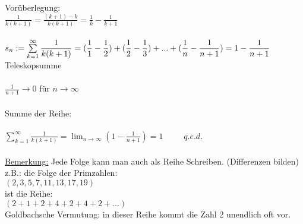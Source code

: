 \vspace{5mm}
Vorüberlegung:\\
$\displaystyle\frac{1}{k(k+1)} = \displaystyle\frac{(k+1) - k}{k(k+1)} = \frac{1}{k} - \displaystyle\frac{1}{k + 1}$\\ \\
$s_n := \sum\limits_{k = 1}^{\infty} \displaystyle\frac{1}{k(k+1)}
= (\displaystyle\frac{1}{1} - \displaystyle\frac{1}{2}) + (\displaystyle\frac{1}{2} - \displaystyle\frac{1}{3}) + ... + (\displaystyle\frac{1}{n} - \displaystyle\frac{1}{n + 1})\\ \\
= 1 - \displaystyle\frac{1}{n + 1}\\ $ Teleskopsumme \\ \\
$\displaystyle\frac{1}{n + 1} \to 0$ für $n \to \infty$\\ \\
Summe der Reihe:\\ \\
$\sum\limits_{k = 1}^{\infty} \displaystyle\frac{1}{k(k+1)} = \lim_{n \to \infty}(1 - \displaystyle\frac{1}{n + 1}) = 1 \phantom{XXX} q.e.d.$\\ 
\\
\underline{Bemerkung:} Jede Folge kann man auch als Reihe Schreiben. (Differenzen bilden)\\
z.B.: die Folge der Primzahlen:\\
$(2, 3, 5, 7, 11, 13, 17, 19)$\\
ist die Reihe:\\
$(2 + 1 + 2+ 4+2+4+2+...)$\\
Goldbachsche Vermutung: in dieser Reihe kommt die Zahl 2 unendlich oft vor.\\

